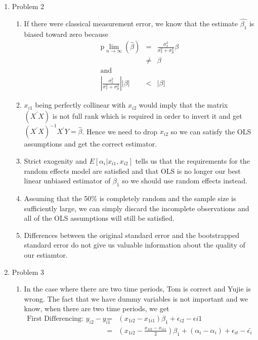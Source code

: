 \documentclass[11pt]{SelfArxOneColBMN}
\begin{document}
\begin{enumerate}
\begin{enumerate}
  \end{enumerate}
  \item Problem 2
  \begin{enumerate}
    \item If there were classical measurement error, we know that the estimate $\hat{\beta_1}$ is biased toward zero because
    \begin{eqnarray*}
      \text{p}\lim_{n\rightarrow\infty}(\hat{\beta}) &=& \frac{\sigma_x^2}{\sigma_x^2 + \sigma^2_\mu}\beta\\
      &\neq& \beta\\
      \text{and}\\
      |\frac{\sigma_x^2}{\sigma_x^2 + \sigma^2_\mu}||\beta| &<& |\beta|
    \end{eqnarray*}
    \item $x_{i1}$ being perfectly collinear with $x_{i2}$ would imply that the matrix $(X^\prime X)$ is not full rank which is required in order to invert it and get $(X^\prime X)^{-1}X^\prime Y = \hat{\beta}$. Hence we need to drop $x_{i2}$ so we can satisfy the OLS assumptions and get the correct estimator.
    \item Strict exogenity and $E[\alpha_i|x_{i1},x_{i2}]$ tells us that the requirements for the random effects model are satisfied and that OLS is no longer our best linear unbiased estimator of $\beta_1$ so we should use random effects instead.
    \item Assuming that the 50\% is completely random and the sample size is sufficiently large, we can simply discard the incomplete observations and all of the OLS assumptions will still be satisfied.
    \item Differences between the original standard error and the bootstrapped standard error do not give us valuable information about the quality of our estiamtor.
    \end{enumerate}
  \item Problem 3
  \begin{enumerate}
    \item In the case where there are two time periods, Tom is correct and Yujie is wrong. The fact that we have dummy variables is not important and we know, when there are two time periods, we get
    \begin{eqnarray*}
      \text{First Differencing: }y_{i2} - y_{i1} &=& (x_{1i2} - x_{1i1})\beta_1 + \epsilon_{i2} - \epsilon{i1}\\
      &=& (x_{1i2} - \frac{x_{1i2} - x_{1i1}}{2})\beta_1 + (\alpha_i - \alpha_i) + \epsilon_{it} - \bar{\epsilon_i}\\

\end{eqnarray*}
\end{enumerate}
\end{enumerate}
\end{document}
